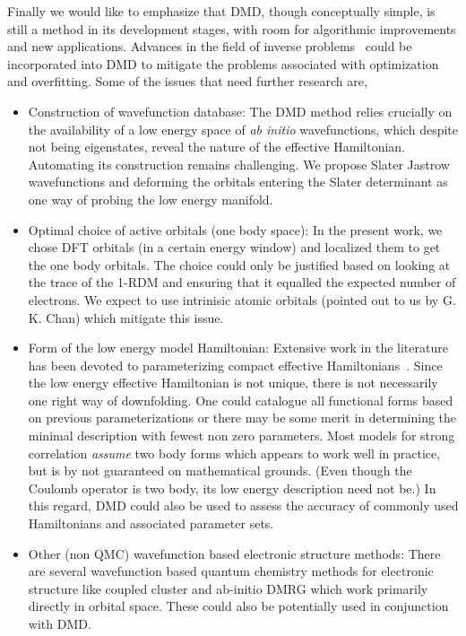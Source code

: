 Finally we would like to emphasize that DMD, though conceptually simple, 
is still a method in its development stages, with room for algorithmic improvements and new applications. 
Advances in the field of inverse problems~\cite{Berg2017} could be incorporated into DMD to 
mitigate the problems associated with optimization and overfitting. 
Some of the issues that need further research are,
\begin{itemize} 
	\item Construction of wavefunction database:
	The DMD method relies crucially on the availability of a low energy space of \textit{ab initio} wavefunctions, 
	which despite not being eigenstates, reveal the nature of the effective Hamiltonian. Automating its construction 
	remains challenging. We propose Slater Jastrow wavefunctions and deforming the orbitals entering the Slater 
	determinant as one way of probing the low energy manifold.
	\item Optimal choice of active orbitals (one body space):
	In the present work, we chose DFT orbitals (in a certain energy window) and localized them to get the one body orbitals. 
	The choice could only be justified based on looking at the trace of the 1-RDM and ensuring that it 
	equalled the expected number of electrons. We expect to use intrinisic atomic orbitals (pointed out to us by G. K. Chan) which 
	mitigate this issue. 
	\item Form of the low energy model Hamiltonian:
	Extensive work in the literature has been devoted to parameterizing compact effective Hamiltonians~\cite{Georges, Oles, Coury}. 
	Since the low energy effective Hamiltonian is not unique, there is not necessarily one right way of downfolding. 
	One could catalogue all functional forms based on previous parameterizations 
	or there may be some merit in determining the minimal description with fewest non zero parameters.
	Most models for strong correlation \textit{assume} two body forms which appears to work well in practice, 
	but is by not guaranteed on mathematical grounds. (Even though the Coulomb operator is two body, 
	its low energy description need not be.) In this regard, DMD could also be used to assess 
	the accuracy of commonly used Hamiltonians and associated parameter sets.
	\item Other (non QMC) wavefunction based electronic structure methods:
	There are several wavefunction based quantum chemistry 
	methods for electronic structure like coupled cluster and ab-initio DMRG which work primarily 
	directly in orbital space. These could also be potentially used in conjunction with DMD.
\end{itemize} 

